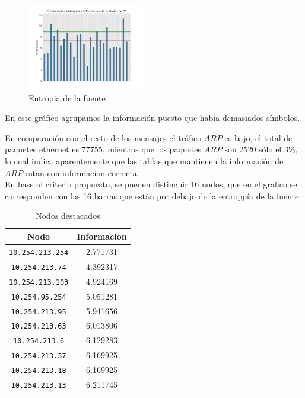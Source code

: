 \begin{figure}[H]
  \centering
    \includegraphics[width=0.45\textwidth]{entropia_red_despegar.png}
  \caption{Entropia de la fuente}
  \label{entropia-s1}
\end{figure}
En este gráfico agrupamos la información puesto que había demasiados símbolos.

En comparación con el resto de los mensajes el tráfico $ARP$ es bajo, el total de paquetes ethernet es $77755$, mientras que los paquetes $ARP$ son $2520$ sólo el 3\%, lo cual indica aparentemente que las tablas que mantienen la información de $ARP$ estan con informacion correcta. 
\\En base al criterio propuesto, se pueden distinguir 16 nodos, que en el grafico se corresponden con las 16 barras que están por debajo de la entroppía de la fuente:   

    \begin{table}[ht]\begin{center}
      \begin{tabular}{|c|c|}
      \hline
      \textbf{Nodo} & \textbf{Informacion} \\ \hline
      \texttt{10.254.213.254}&2.771731\\ \hline
      \texttt{10.254.213.74}&4.392317\\ \hline
      \texttt{10.254.213.103}&4.924169\\ \hline
      \texttt{10.254.95.254}&5.051281 \\ \hline
      \texttt{10.254.213.95}&5.941656 \\ \hline
      \texttt{10.254.213.63}&6.013806 \\ \hline
      \texttt{10.254.213.6}&6.129283 \\ \hline
      \texttt{10.254.213.37}&6.169925 \\ \hline
      \texttt{10.254.213.18}&6.169925 \\ \hline
      \texttt{10.254.213.13}&6.211745 \\ \hline
      \end{tabular}
      \caption{Nodos destacados}
      \label{Nodos-destacados}
    \end{center}\end{table}

